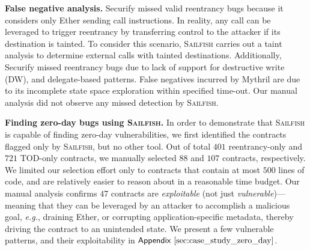 \documentclass[conference, romanappendices]{tex/IEEEtran}
\theoremstyle{bfnote}
\newcommand{\toolname}{\textsc{Sailfish}\xspace}
\newcommand{\securify}{{\sc Securify}\xspace}
\newcommand{\ether}{{Ether}\xspace}
\newcommand{\reentrancy}{{reentrancy}\xspace}
\newcommand{\mythril}{{\sc Mythril}\xspace}
\newcommand{\eg}{\textit{e.g.}}
\newcommand{\Appen}[1]{\ensuremath{\sf Appendix~\ref{#1}}}
\newcommand{\clintOnlyDAO}{401}
\newcommand{\clintOnlyDAOTriage}{88}
\newcommand{\clintOnlyTOD}{721}
\newcommand{\clintOnlyTODTriage}{107}
\newcommand{\zeroDays}{47}
\begin{document}
\noindent
\textbf{False negative analysis.}
\securify{} missed valid \reentrancy bugs because it considers only \ether sending call instructions.
In reality, any call can be leveraged to trigger \reentrancy by transferring control to the attacker if its destination is tainted.
To consider this scenario, \toolname{} carries out a taint analysis to determine external calls with tainted destinations.
Additionally, \securify missed \reentrancy bugs due to lack of support for destructive write (DW), and delegate-based patterns.
False negatives incurred by \mythril{} are due to its incomplete state space exploration within specified time-out.
Our manual analysis did not observe any missed detection by \toolname.

\noindent
\textbf{Finding zero-day bugs using \toolname.}
In order to demonstrate that \toolname is capable of finding zero-day vulnerabilities, we first identified the contracts flagged only by \toolname, but no other tool.
Out of total $\clintOnlyDAO$ \reentrancy-only and $\clintOnlyTOD$ TOD-only contracts, we manually selected $\clintOnlyDAOTriage$ and $\clintOnlyTODTriage$ contracts, respectively.
We limited our selection effort only to contracts that contain at most $500$ lines of code, and are relatively easier to reason about in a reasonable time budget.
Our manual analysis confirms $\zeroDays$ contracts are \textit{exploitable} (not just \textit{vulnerable})---meaning that they can be leveraged by an attacker to accomplish a malicious goal, \eg, draining \ether, or corrupting application-specific metadata, thereby driving the contract to an unintended state.
We present a few vulnerable patterns, and their exploitability in \Appen{sec:case_study_zero_day}.
\end{document}
